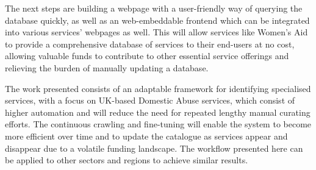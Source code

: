 \documentclass[conference]{IEEEtran}
\begin{document}
The next steps are building a webpage with a user-friendly way of querying the database quickly, as well as an web-embeddable frontend which can be integrated into various services' webpages as well. This will allow services like Women's Aid to provide a comprehensive database of services to their end-users at no cost, allowing valuable funds to contribute to other essential service offerings and relieving the burden of manually updating a database.

The work presented consists of an adaptable framework for identifying specialised services, with a focus on UK-based Domestic Abuse services, which consist of higher automation and will reduce the need for repeated lengthy manual curating efforts.
The continuous crawling and fine-tuning will enable the system to become more efficient over time and to update the catalogue as services appear and disappear due to a volatile funding landscape. The workflow presented here can be applied to other sectors and regions to achieve similar results.


\end{document}
